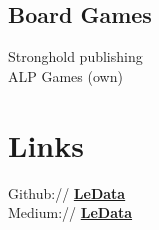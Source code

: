 \documentclass[a4paper]{deedy-resume} %
\begin{document}
\begin{minipage}[t]{0.28\textwidth}

\sectionspace %

\subsection{Board Games}
Stronghold publishing\\
ALP Games (own)
\sectionspace %

\section{Links} 

Github:// \href{https://github.com/LeData}{\bf LeData} \\
Medium:// \href{https://medium.com/@LeData}{\bf LeData}



\end{minipage} %
\hfill
%
%
\end{document}
